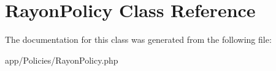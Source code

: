 \hypertarget{class_app_1_1_policies_1_1_rayon_policy}{}\section{Rayon\+Policy Class Reference}
\label{class_app_1_1_policies_1_1_rayon_policy}


The documentation for this class was generated from the following file\+:\begin{DoxyCompactItemize}
\item 
app/\+Policies/Rayon\+Policy.\+php\end{DoxyCompactItemize}
